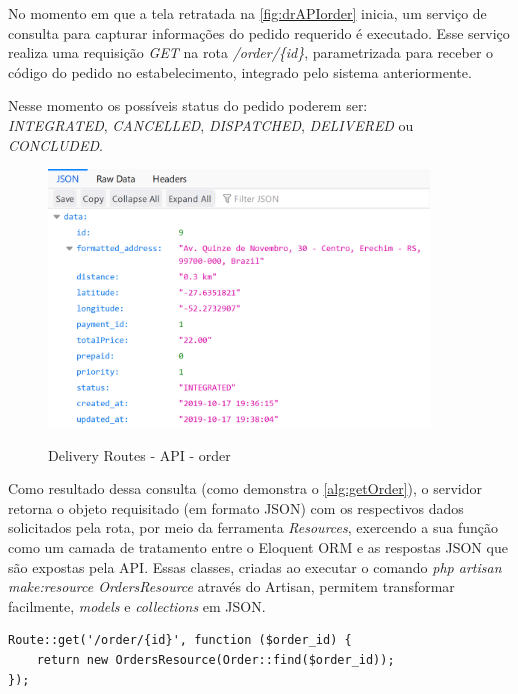 No momento em que a tela retratada na \autoref{fig:drAPIorder} inicia, um serviço de consulta para capturar informações do pedido requerido é executado. Esse serviço realiza uma requisição \textit{GET} na rota \textit{/order/\{id\}}, parametrizada para receber o código do pedido no estabelecimento, integrado pelo sistema anteriormente.

Nesse momento os possíveis status do pedido poderem ser: 
\\ \textit{INTEGRATED}, \textit{CANCELLED}, \textit{DISPATCHED}, \textit{DELIVERED} ou \textit{CONCLUDED}.

\begin{figure}[H]
    \centering
    \caption{Delivery Routes - API - order}
    \includegraphics[width=0.9\textwidth]{./dados/figuras/fig22}
    \label{fig:drAPIorder}
\end{figure}

Como resultado dessa consulta (como demonstra o \autoref{alg:getOrder}), o servidor retorna o objeto requisitado (em formato JSON) com os respectivos dados solicitados pela rota, por meio da ferramenta \textit{Resources}, exercendo a sua função como um camada de tratamento entre o Eloquent ORM e as respostas JSON que são expostas pela API. Essas classes, criadas ao executar o comando \textit{php artisan make:resource OrdersResource} através do Artisan, permitem transformar facilmente, \textit{models} e \textit{collections} em JSON.

\begin{lstlisting}[caption={Delivery Routes - Route order}, style=htmlcssjs, label=alg:getOrder]
Route::get('/order/{id}', function ($order_id) {
    return new OrdersResource(Order::find($order_id));
});
\end{lstlisting}